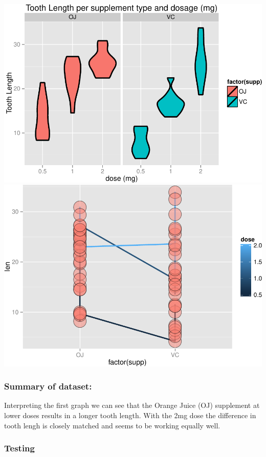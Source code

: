 \documentclass[]{article}
\begin{document}
\includegraphics{./Q2_files/figure-latex/exploratory1.pdf}
\includegraphics{./Q2_files/figure-latex/exploratory2.pdf}

\subsubsection{Summary of dataset:}\label{summary-of-dataset}

Interpreting the first graph we can see that the Orange Juice (OJ)
supplement at lower doses results in a longer tooth length. With the 2mg
dose the difference in tooth lengh is closely matched and seems to be
working equally well.

\subsubsection{Testing}\label{testing}
\end{document}
